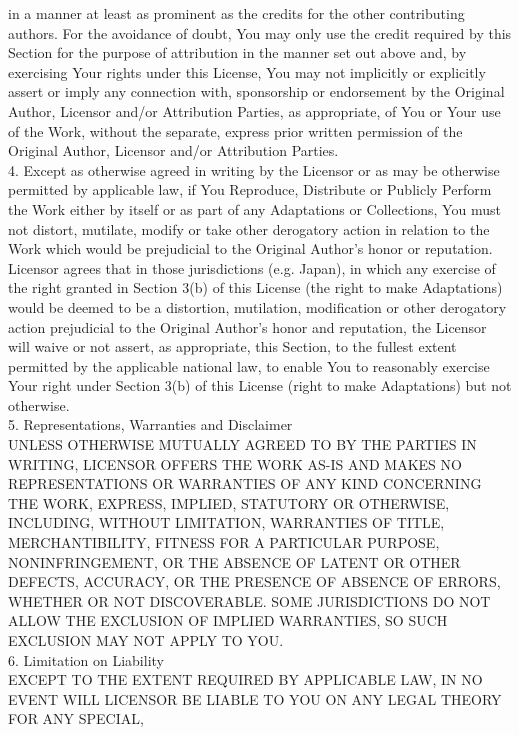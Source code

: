 {   in a manner at least as prominent as the credits for the other
   contributing authors. For the avoidance of doubt, You may only use
   the credit required by this Section for the purpose of attribution
   in the manner set out above and, by exercising Your rights under
   this License, You may not implicitly or explicitly assert or imply
   any connection with, sponsorship or endorsement by the Original
   Author, Licensor and/or Attribution Parties, as appropriate, of You
   or Your use of the Work, without the separate, express prior
   written permission of the Original Author, Licensor and/or
   Attribution Parties.
\\[4pt]
   4. Except as otherwise agreed in writing by the Licensor or as may
   be otherwise permitted by applicable law, if You Reproduce,
   Distribute or Publicly Perform the Work either by itself or as part
   of any Adaptations or Collections, You must not distort, mutilate,
   modify or take other derogatory action in relation to the Work
   which would be prejudicial to the Original Author's honor or
   reputation. Licensor agrees that in those jurisdictions
   (e.g. Japan), in which any exercise of the right granted in Section
   3(b) of this License (the right to make Adaptations) would be
   deemed to be a distortion, mutilation, modification or other
   derogatory action prejudicial to the Original Author's honor and
   reputation, the Licensor will waive or not assert, as appropriate,
   this Section, to the fullest extent permitted by the applicable
   national law, to enable You to reasonably exercise Your right under
   Section 3(b) of this License (right to make Adaptations) but not
   otherwise.
\\[4pt]
5. Representations, Warranties and Disclaimer
\\[4pt]
UNLESS OTHERWISE MUTUALLY AGREED TO BY THE PARTIES IN WRITING,
LICENSOR OFFERS THE WORK AS-IS AND MAKES NO REPRESENTATIONS OR
WARRANTIES OF ANY KIND CONCERNING THE WORK, EXPRESS, IMPLIED,
STATUTORY OR OTHERWISE, INCLUDING, WITHOUT LIMITATION, WARRANTIES OF
TITLE, MERCHANTIBILITY, FITNESS FOR A PARTICULAR PURPOSE,
NONINFRINGEMENT, OR THE ABSENCE OF LATENT OR OTHER DEFECTS, ACCURACY,
OR THE PRESENCE OF ABSENCE OF ERRORS, WHETHER OR NOT
DISCOVERABLE. SOME JURISDICTIONS DO NOT ALLOW THE EXCLUSION OF IMPLIED
WARRANTIES, SO SUCH EXCLUSION MAY NOT APPLY TO YOU.
\\[4pt]
6. Limitation on Liability
\\[4pt]
EXCEPT TO THE EXTENT REQUIRED BY APPLICABLE LAW, IN NO EVENT WILL
LICENSOR BE LIABLE TO YOU ON ANY LEGAL THEORY FOR ANY SPECIAL,
}
